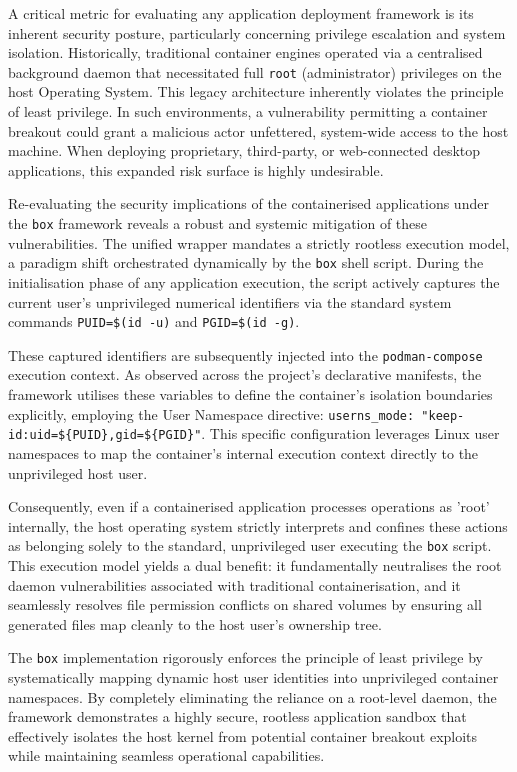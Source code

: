 \documentclass[journal,onecolumn]{IEEEtran}
\newcommand{\code}[1]{\texttt{#1}}
\begin{document}
A critical metric for evaluating any application deployment framework is its inherent security posture, particularly concerning privilege escalation and system isolation. Historically, traditional container engines operated via a centralised background daemon that necessitated full \code{root} (administrator) privileges on the host Operating System. This legacy architecture inherently violates the principle of least privilege. In such environments, a vulnerability permitting a container breakout could grant a malicious actor unfettered, system-wide access to the host machine. When deploying proprietary, third-party, or web-connected desktop applications, this expanded risk surface is highly undesirable.

Re-evaluating the security implications of the containerised applications under the \code{box} framework reveals a robust and systemic mitigation of these vulnerabilities. The unified wrapper mandates a strictly rootless execution model, a paradigm shift orchestrated dynamically by the \code{box} shell script. During the initialisation phase of any application execution, the script actively captures the current user's unprivileged numerical identifiers via the standard system commands \code{PUID=\$(id -u)} and \code{PGID=\$(id -g)}. 

These captured identifiers are subsequently injected into the \code{podman-compose} execution context. As observed across the project's declarative manifests, the framework utilises these variables to define the container's isolation boundaries explicitly, employing the User Namespace directive: \code{userns\_mode: "keep-id:uid=\$\{PUID\},gid=\$\{PGID\}"}. This specific configuration leverages Linux user namespaces to map the container's internal execution context directly to the unprivileged host user. 

Consequently, even if a containerised application processes operations as 'root' internally, the host operating system strictly interprets and confines these actions as belonging solely to the standard, unprivileged user executing the \code{box} script. This execution model yields a dual benefit: it fundamentally neutralises the root daemon vulnerabilities associated with traditional containerisation, and it seamlessly resolves file permission conflicts on shared volumes by ensuring all generated files map cleanly to the host user's ownership tree.

The \code{box} implementation rigorously enforces the principle of least privilege by systematically mapping dynamic host user identities into unprivileged container namespaces. By completely eliminating the reliance on a root-level daemon, the framework demonstrates a highly secure, rootless application sandbox that effectively isolates the host kernel from potential container breakout exploits while maintaining seamless operational capabilities.
\end{document}
